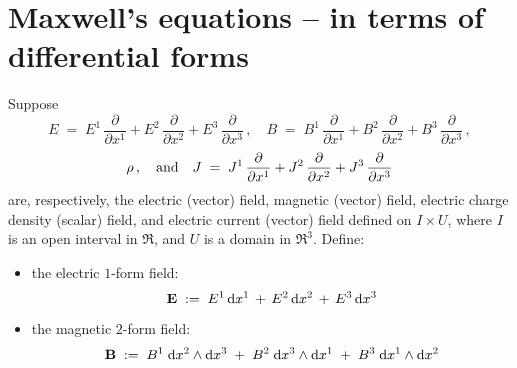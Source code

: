

\section{Maxwell's equations -- in terms of differential forms}
\setcounter{theorem}{0}
\setcounter{equation}{0}


\renewcommand{\theenumi}{\roman{enumi}}
\renewcommand{\labelenumi}{\textnormal{(\theenumi)}$\;\;$}


\begin{theorem}
\label{MaxwellsEquationsDifferentialForms}
\mbox{}
\vskip 0.2cm
\noindent
Suppose
\begin{equation*}
E \; = \; E^{1}\,\dfrac{\partial}{\partial x^{1}} + E^{2}\,\dfrac{\partial}{\partial x^{2}} + E^{3}\,\dfrac{\partial}{\partial x^{3}}\,,
\quad
B \; = \; B^{1}\,\dfrac{\partial}{\partial x^{1}} + B^{2}\,\dfrac{\partial}{\partial x^{2}} + B^{3}\,\dfrac{\partial}{\partial x^{3}}\,,
\end{equation*}
\begin{equation*}
\rho\,,
\quad\textnormal{and}\quad
J \; = \; J^{1}\,\dfrac{\partial}{\partial x^{1}} + J^{2}\,\dfrac{\partial}{\partial x^{2}} + J^{3}\,\dfrac{\partial}{\partial x^{3}}
\end{equation*}
are, respectively, the electric (vector) field, magnetic (vector) field,
electric charge density (scalar) field, and electric current (vector) field
defined on $I \times U$,
where $I$ is an open interval in $\Re$, and $U$ is a domain in $\Re^{3}$.
\vskip 0.3cm
\noindent
Define:
\begin{itemize}
\item
	the electric $1$-form field:
	\begin{equation*}
	\mathbf{E} \; := \; E^{1}\,\textnormal{d} x^{1} \,+\, E^{2}\,\textnormal{d} x^{2} \,+\, E^{3}\,\textnormal{d} x^{3}
	\end{equation*}
\item
	the magnetic $2$-form field:
	\begin{equation*}
	\mathbf{B}
	\; := \;
		B^{1}\;\textnormal{d} x^{2} \wedge \textnormal{d} x^{3}
		\;+\;
		B^{2}\;\textnormal{d} x^{3} \wedge \textnormal{d} x^{1}
		\;+\;
		B^{3}\;\textnormal{d} x^{1} \wedge \textnormal{d} x^{2}
	\end{equation*}

\end{itemize}
\end{theorem}
